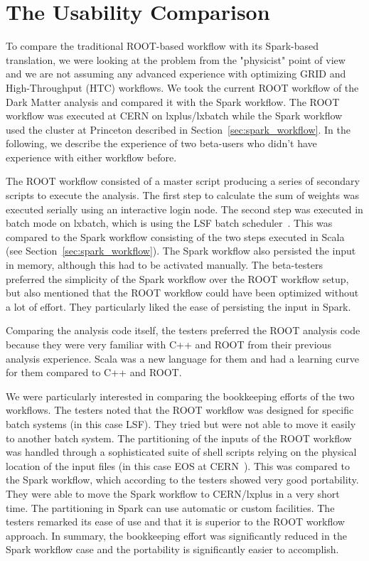 \documentclass[a4paper]{jpconf}
\begin{document}
\section{The Usability Comparison}

To compare the traditional ROOT-based workflow with its Spark-based translation, we were looking at the problem from the  "physicist" point of view and we are not assuming any advanced experience with optimizing GRID and High-Throughput (HTC) workflows. We took the current ROOT workflow of the Dark Matter analysis and compared it with the Spark workflow. The ROOT workflow was executed at CERN on lxplus/lxbatch while the Spark workflow used the cluster at Princeton described in Section~\ref{sec:spark_workflow}. In the following, we describe the experience of two beta-users who didn't have experience with either workflow before.

The ROOT workflow consisted of a master script producing a series of secondary scripts to execute the analysis. The first step to calculate the sum of weights was executed serially using an interactive login node. The second step was executed in batch mode on lxbatch, which is using the LSF batch scheduler~\cite{lsf}. This was compared to the Spark workflow consisting of the two steps executed in Scala (see Section~\ref{sec:spark_workflow}). The Spark workflow also persisted the input in memory, although this had to be activated manually. The beta-testers preferred the simplicity of the Spark workflow over the ROOT workflow setup, but also mentioned that the ROOT workflow could have been optimized without a lot of effort. They particularly liked the ease of persisting the input in Spark.

Comparing the analysis code itself, the testers preferred the ROOT analysis code because they were very familiar with C++ and ROOT from their previous analysis experience. Scala was a new language for them and had a learning curve for them compared to C++ and ROOT.

We were particularly interested in comparing the bookkeeping efforts of the two workflows. The testers noted that the ROOT workflow was designed for specific batch systems (in this case LSF). They tried but were not able to move it easily to another batch system. The partitioning of the inputs of the ROOT workflow was handled through a sophisticated suite of shell scripts relying on the physical location of the input files (in this case EOS at CERN~\cite{eos}). This was compared to the Spark workflow, which according to the testers showed very good portability. They were able to move the Spark workflow to CERN/lxplus in a very short time. The partitioning in Spark can use automatic or custom facilities. The testers remarked its ease of use and that it is superior to the ROOT workflow approach. In summary, the bookkeeping effort was significantly reduced in the Spark workflow case and the portability is significantly easier to accomplish.
\end{document}
